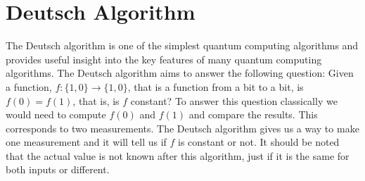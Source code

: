     \section{Deutsch Algorithm}
    The Deutsch algorithm is one of the simplest quantum computing algorithms and provides useful insight into the key features of many quantum computing algorithms.
    The Deutsch algorithm aims to answer the following question: Given a function, \(f\colon\{1, 0\} \to \{1, 0\}\), that is a function from a bit to a bit, is \(f(0) = f(1)\), that is, is \(f\) constant?
    To answer this question classically we would need to compute \(f(0)\) and \(f(1)\) and compare the results.
    This corresponds to two measurements.
    The Deutsch algorithm gives us a way to make one measurement and it will tell us if \(f\) is constant or not.
    It should be noted that the actual value is not known after this algorithm, just if it is the same for both inputs or different.
    
